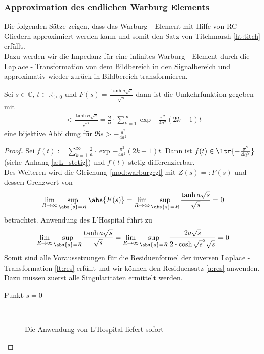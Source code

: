 \subsubsection{Approximation des endlichen Warburg Elements}\label{mod:finiteWarburg}
Die folgenden Sätze zeigen, dass das Warburg - Element mit Hilfe von RC - Gliedern approximiert werden kann und somit den Satz von Titchmarsh \ref{ht:titch} erfüllt. \\
Dazu werden wir die Impedanz für eine infinites Warburg - Element durch die Laplace - Transformation von dem Bildbereich in den Signalbereich und approximativ wieder zurück in Bildbereich transformieren. 
\begin{satz}
Sei $s \in \mathbb{C}$, $t \in \mathbb{R}_{\geq 0}$ und $F(s) = \frac{\tanh{a \sqrt{s}}}{\sqrt{s}}$ dann ist die Umkehrfunktion gegeben mit
\begin{align}
	\lt{\frac{\tanh{a \sqrt{s}}}{\sqrt{s}}} = \frac{2}{a} \cdot \sum_{k=1}^{\infty}  \exp{-\frac{\pi^2}{4 a^2} \left( 2 k - 1 \right) t} \label{mod:umkehr}
\end{align}
eine bijektive Abbildung für $\Re{s} > - \frac{\pi^2}{4 a^2}$
\begin{proof}
Sei $f(t):= \sum_{k=1}^{\infty} \frac{2}{a} \cdot \exp{-\frac{\pi^2}{4 a^2} \left( 2 k - 1 \right) t}$. Dann ist $f(t)\in \ltr{-\frac{\pi^2}{4 a^2}}$ (siehe Anhang \ref{a:L_stetig}) und $f(t)$ stetig differenzierbar.\\ 
Des Weiteren wird die Gleichung \ref{mod:warburg:gl} mit $Z(s) =:F(s)$ und dessen Grenzwert von 
\begin{align}
	\lim_{R \rightarrow \infty} \sup_{\abs{s} = R} \abs{F(s)} = \lim_{R \rightarrow \infty} \sup_{\abs{s} = R} \frac{\tanh{a \sqrt{s}}}{\sqrt{s}} = 0
\end{align} betrachtet.
Anwendung des L'Hospital führt zu 
\begin{align}
	\lim_{R \rightarrow \infty} \sup_{\abs{s} = R} \frac{\tanh{a \sqrt{s}}}{\sqrt{s}} = \lim_{R \rightarrow \infty} \sup_{\abs{s} = R} \frac{2 a \sqrt{s}}{2 \cdot \cosh{\sqrt{s}}^2 \sqrt{s}} = 0
\end{align} Somit sind alle Voraussetzungen für die Residuenformel der inversen Laplace - Transformation \ref{lt:res} erfüllt und wir können den Residuensatz \ref{a:res} anwenden. Dazu müssen zuerst alle Singularitäten ermittelt werden.
\begin{description}
\item[Punkt $s=0$] ~\par
	Die Anwendung von L'Hospital liefert sofort 

\end{description}
\end{proof}
\end{satz}
